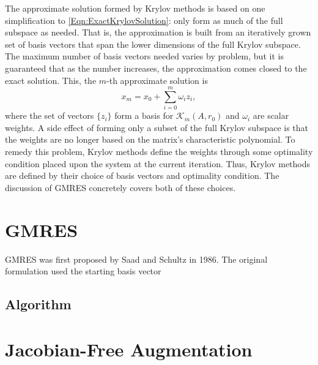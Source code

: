 \documentclass[Prelim,12pt]{WisconsinThesis}
\begin{document}
The approximate solution formed by Krylov methods is based on one simplification to \cref{Eqn:ExactKrylovSolution}: only form as much of the full subspace as needed.
That is, the approximation is built from an iteratively grown set of basis vectors that span the lower dimensions of the full Krylov subspace.
The maximum number of basis vectors needed varies by problem, but it is guaranteed that as the number increases, the approximation comes closed to the exact solution.
This, the $m$-th approximate solution is
\begin{equation}
    x_m = x_0 + \sum_{i = 0}^{m} \omega_i z_i,
    \label{Eqn:ApproximateKrylovSolution}
\end{equation}
where the set of vectors $\{z_i\}$ form a basis for $\mathcal{K}_m(A,r_0)$ and $\omega_i$ are scalar weights.
A side effect of forming only a subset of the full Krylov subspace is that the weights are no longer based on the matrix's characteristic polynomial.
To remedy this problem, Krylov methods define the weights through some optimality condition placed upon the system at the current iteration.
Thus, Krylov methods are defined by their choice of basis vectors and optimality condition.
The discussion of GMRES concretely covers both of these choices.



\section{GMRES}
GMRES was first proposed by Saad and Schultz in 1986.
The original formulation used the starting basis vector $ $


\subsection{Algorithm}


\section{Jacobian-Free Augmentation}
\end{document}
